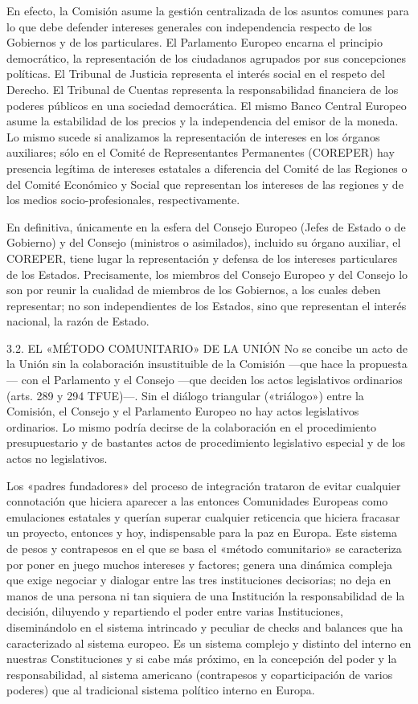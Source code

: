 \documentclass[10pt,a4paper]{article}
\begin{document}
En efecto, la Comisión asume la gestión centralizada de los asuntos comunes para lo que debe defender intereses generales con independencia respecto de los Gobiernos y de los particulares. El Parlamento Europeo encarna el principio democrático, la representación de los ciudadanos agrupados por sus concepciones políticas. El Tribunal de Justicia representa el interés social en el respeto del Derecho. El Tribunal de Cuentas representa la responsabilidad financiera de los poderes públicos en una sociedad democrática. El mismo Banco Central Europeo asume la estabilidad de los precios y la independencia del emisor de la moneda. Lo mismo sucede si analizamos la representación de intereses en los órganos auxiliares; sólo en el Comité de Representantes Permanentes (COREPER) hay presencia legítima de intereses estatales a diferencia del Comité de las Regiones o del Comité Económico y Social que representan los intereses de las regiones y de los medios socio-profesionales, respectivamente.

En definitiva, únicamente en la esfera del Consejo Europeo (Jefes de Estado o de Gobierno) y del Consejo (ministros o asimilados), incluido su órgano auxiliar, el COREPER, tiene lugar la representación y defensa de los intereses particulares de los Estados. Precisamente, los miembros del Consejo Europeo y del Consejo lo son por reunir la cualidad de miembros de los Gobiernos, a los cuales deben representar; no son independientes de los Estados, sino que representan el interés nacional, la razón de Estado.

3.2. EL «MÉTODO COMUNITARIO» DE LA UNIÓN
No se concibe un acto de la Unión sin la colaboración insustituible de la Comisión —que hace la propuesta— con el Parlamento y el Consejo —que deciden los actos legislativos ordinarios (arts. 289 y 294 TFUE)—. Sin el diálogo triangular («triálogo») entre la Comisión, el Consejo y el Parlamento Europeo no hay actos legislativos ordinarios. Lo mismo podría decirse de la colaboración en el procedimiento presupuestario y de bastantes actos de procedimiento legislativo especial y de los actos no legislativos.

Los «padres fundadores» del proceso de integración trataron de evitar cualquier connotación que hiciera aparecer a las entonces Comunidades Europeas como emulaciones estatales y querían superar cualquier reticencia que hiciera fracasar un proyecto, entonces y hoy, indispensable para la paz en Europa. Este sistema de pesos y contrapesos en el que se basa el «método comunitario» se caracteriza por poner en juego muchos intereses y factores; genera una dinámica compleja que exige negociar y dialogar entre las tres instituciones decisorias; no deja en manos de una persona ni tan siquiera de una Institución la responsabilidad de la decisión, diluyendo y repartiendo el poder entre varias Instituciones, diseminándolo en el sistema intrincado y peculiar de checks and balances que ha caracterizado al sistema europeo. Es un sistema complejo y distinto del interno en nuestras Constituciones y si cabe más próximo, en la concepción del poder y la responsabilidad, al sistema americano (contrapesos y coparticipación de varios poderes) que al tradicional sistema político interno en Europa. 
\end{document}
